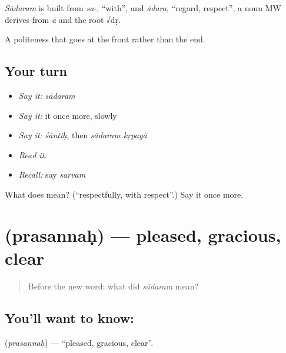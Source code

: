 \begin{cousinweb}
\emph{Sādaram} is built from \emph{sa-}, \textquotedblleft{}with\textquotedblright{}, and \emph{ādara}, \textquotedblleft{}regard, respect\textquotedblright{}, a noun MW derives from \emph{ā} and the root √dṛ.
\end{cousinweb}

\begin{grammarlens}[title={What you've built}]
A politeness that goes at the front rather than the end.
\end{grammarlens}

\subsection*{Your turn}
\begin{itemize}
\raggedright
  \item \emph{Say it:} \emph{sādaram}
  \item \emph{Say it:} it once more, slowly
  \item \emph{Say it:} \emph{śāntiḥ}, then \emph{sādaram kṛpayā}
  \item \emph{Read it:} \textbf{}
  \item \emph{Recall:} say \emph{sarvam}
\end{itemize}

\begin{tcolorbox}[breakable,colback=teal!4,colframe=teal!35!black,title={Before you move on}]
What does  mean? (\textquotedblleft{}respectfully, with respect\textquotedblright{}.) Say it once more.
\end{tcolorbox}
\section[\texorpdfstring{\sk{प्रसन्नः} (prasannaḥ)}{प्रसन्नः (prasannaḥ)}]{ (prasannaḥ) — pleased, gracious, clear}

\label{lesson:SA-C37-gracious}



\begin{quote}
Before the new word: what did \emph{sādaram} mean?
\end{quote}

\subsection*{You'll want to know: }
\textbf{} (\emph{prasannaḥ}) — \textquotedblleft{}pleased, gracious, clear\textquotedblright{}.

